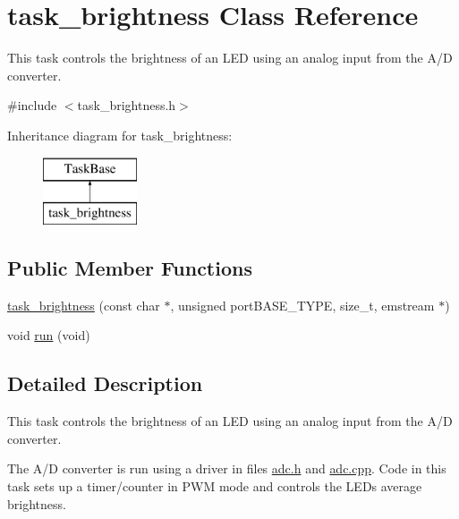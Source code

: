 \hypertarget{classtask__brightness}{}\section{task\+\_\+brightness Class Reference}
\label{classtask__brightness}


This task controls the brightness of an L\+ED using an analog input from the A/D converter.  




{\ttfamily \#include $<$task\+\_\+brightness.\+h$>$}

Inheritance diagram for task\+\_\+brightness\+:\begin{figure}[H]
\begin{center}
\leavevmode
\includegraphics[height=2.000000cm]{classtask__brightness}
\end{center}
\end{figure}
\subsection*{Public Member Functions}
\begin{DoxyCompactItemize}
\item 
\mbox{\hyperlink{classtask__brightness_a5802baf3a0c9fe53ccbce8966d1fad47}{task\+\_\+brightness}} (const char $\ast$, unsigned port\+B\+A\+S\+E\+\_\+\+T\+Y\+PE, size\+\_\+t, emstream $\ast$)
\item 
void \mbox{\hyperlink{classtask__brightness_a615beac07a99f0856f048a46fd9a3898}{run}} (void)
\end{DoxyCompactItemize}


\subsection{Detailed Description}
This task controls the brightness of an L\+ED using an analog input from the A/D converter. 

The A/D converter is run using a driver in files {\ttfamily \mbox{\hyperlink{adc_8h}{adc.\+h}}} and {\ttfamily \mbox{\hyperlink{adc_8cpp}{adc.\+cpp}}}. Code in this task sets up a timer/counter in P\+WM mode and controls the L\+ED\textquotesingle{}s average brightness. 

